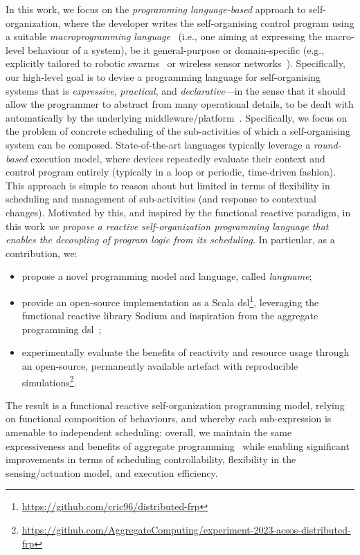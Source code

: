 In this work, we focus on the \emph{programming language-based} approach to self-organization,
 where the developer writes the self-organising control program
 using a suitable \emph{macroprogramming language}~\cite{casadei2023macro,DBLP:journals/jisa/JuniorSBP21} (i.e., one aiming at expressing the macro-level behaviour of a system), be it general-purpose or domain-specific (e.g., explicitly tailored to robotic swarms~\cite{DBLP:journals/swarm/BrambillaFBD13} or wireless sensor networks~\cite{DBLP:journals/csur/MottolaP11}).
%
Specifically, our high-level goal
 is to devise a programming language
 for self-organising systems
 that is \emph{expressive}, \emph{practical},
 and \emph{declarative}---in the sense that it should allow the programmer to abstract from
many operational details, to be dealt with automatically by the underlying middleware/platform~\cite{DBLP:conf/iotdi/NoorTGS19,CPPVW-FI2020}.
%
Specifically, we focus on the problem of concrete scheduling of the sub-activities of which a self-organising system can be composed.
%
State-of-the-art languages typically leverage a \emph{round-based} execution model,
 where devices repeatedly evaluate their context and control program entirely
(typically in a loop or periodic, time-driven fashion).
%
This approach is simple to reason about but
 limited in terms of flexibility in scheduling
 and management of sub-activities (and response to contextual changes).
%
Motivated by this, and inspired by the functional reactive paradigm,
 in this work 
 \emph{we propose a reactive self-organization programming language
 that enables the decoupling of program logic from its scheduling}.
% 
In particular, as a contribution, we:
\begin{itemize}
\item propose a novel programming model and language, called \emph{\ac{langname}};
\item provide an open-source implementation as a Scala \ac{dsl}\footnote{\label{acsos2023-frp:footnote:dsl}\url{https://github.com/cric96/distributed-frp}},
 leveraging the functional reactive library Sodium and 
 inspiration from the \scafi{} aggregate programming \ac{dsl}~\cite{DBLP:journals/softx/CasadeiVAP22,DBLP:journals/lmcs/AudritoCDV23};
\item experimentally evaluate the benefits of reactivity and resource usage
through an open-source, permanently available artefact with reproducible simulations\footnote{\label{acsos2023-frp:footnote:eval}\url{https://github.com/AggregateComputing/experiment-2023-acsos-distributed-frp}}.
\end{itemize}
%
The result is a functional reactive self-organization programming model, 
 relying on functional composition of behaviours,
and whereby each sub-expression is amenable to independent scheduling:
 overall, we maintain the same expressiveness and benefits of aggregate programming~\cite{bpv:aggregate:programming,vbdacp:ac:survey:jlamp}
 while enabling significant improvements in terms of scheduling controllability, flexibility in the sensing/actuation model, and execution efficiency. %

